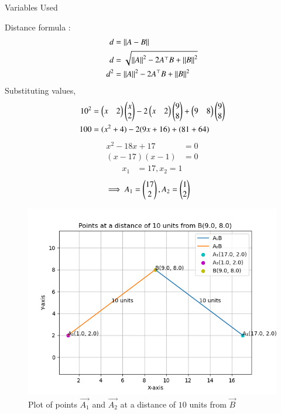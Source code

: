 \documentclass[journal]{IEEEtran}
\begin{document}
\solution
\begin{table}[h!]    
  \centering
  
  \caption{Variables Used}
  \label{tab1.9.19.1}
\end{table}
Distance formula :
\begin{align}
	d&=\left\lVert A-B\right\rVert \\
	d&=\sqrt{\left\lVert A\right\rVert^2-2A^\top B+\left\lVert B\right\rVert^2} \\
	d^2&=\left\lVert A\right\rVert^2-2A^\top B+\left\lVert B\right\rVert^2
\end{align}
Substituting values,
\begin{align}
	10^2&=\begin{pmatrix}x&2\end{pmatrix}\begin{pmatrix}x\\2\end{pmatrix}-2\begin{pmatrix}x&2\end{pmatrix}\begin{pmatrix}9\\8\end{pmatrix}+\begin{pmatrix}9&8\end{pmatrix}\begin{pmatrix}9\\8\end{pmatrix} \\
	100&=(x^2+4)-2(9x+16)+(81+64)
\end{align}
\begin{align}
	x^2-18x+17&=0 \\
	(x-17)(x-1)&=0
\end{align}
\begin{align}
	x_1&=17, x_2=1
\end{align}
\begin{align}
    \implies A_1&=\begin{pmatrix}17\\2\end{pmatrix}, A_2=\begin{pmatrix}1\\2\end{pmatrix}
\end{align}
\begin{figure}[ht!]
	\centering
   	\includegraphics[width=0.8\linewidth]{figs/plot.png}
   	\caption{Plot of points $\vec{A_1}$ and $\vec{A_2}$ at a distance of $10$ units from $\vec{B}$}
\label{Plot}
\end{figure}
\end{document}
